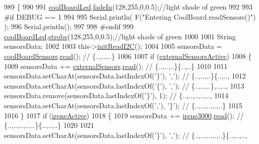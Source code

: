 \begin{DoxyCode}
989 \{
990 
991     \hyperlink{classCoolBoard_a1b1d3c684a5baa56b08486e192fd8e97}{coolBoardLed}.\hyperlink{classCoolBoardLed_ab778f5e7bed0ab74e3906d82110493c3}{fadeIn}(128,255,0,0.5);\textcolor{comment}{//light shade of green}
992                 
993 \textcolor{preprocessor}{#if DEBUG == 1}
994 
995     Serial.println( F(\textcolor{stringliteral}{"Entering CoolBoard.readSensors()"}) );
996     Serial.println();
997 
998 \textcolor{preprocessor}{#endif}
999     \hyperlink{classCoolBoard_a1b1d3c684a5baa56b08486e192fd8e97}{coolBoardLed}.\hyperlink{classCoolBoardLed_ad5f0de4c628cbfbf49896042831c64ad}{strobe}(128,255,0,0.5);\textcolor{comment}{//light shade of green}
1000 
1001     String sensorsData;
1002     
1003     this->\hyperlink{classCoolBoard_a397b46fadab8f530a8cf4d914c561366}{initReadI2C}();
1004 
1005     sensorsData = \hyperlink{classCoolBoard_af102be5288bd7f7a8e59b13f86e26a00}{coolBoardSensors}.\hyperlink{classCoolBoardSensors_a91badb2539d91fda8679f2a597874c48}{read}(); \textcolor{comment}{// \{..,..,..\}}
1006     
1007     \textcolor{keywordflow}{if} (\hyperlink{classCoolBoard_a638b00b76aeb819ecfd4c10b8cdd7bb7}{externalSensorsActive})
1008     \{
1009         sensorsData += \hyperlink{classCoolBoard_a09e26264839c65873eb56af476eff6b2}{externalSensors}.\hyperlink{classExternalSensors_a53177b81eca3be89508b5511ddcd00fc}{read}(); \textcolor{comment}{// \{..,..,..\}\{..,..\}}
1010 
1011         sensorsData.setCharAt(sensorsData.lastIndexOf(\textcolor{charliteral}{'\}'}), \textcolor{charliteral}{','}); \textcolor{comment}{// \{..,..,..\}\{..,..,}
1012         sensorsData.setCharAt(sensorsData.lastIndexOf(\textcolor{charliteral}{'\{'}), \textcolor{charliteral}{','}); \textcolor{comment}{// \{..,..,..\},..,..,}
1013         sensorsData.remove(sensorsData.lastIndexOf(\textcolor{charliteral}{'\}'}), 1); \textcolor{comment}{// \{..,..,..,..,..,}
1014         sensorsData.setCharAt(sensorsData.lastIndexOf(\textcolor{charliteral}{','}), \textcolor{charliteral}{'\}'}); \textcolor{comment}{// \{..,..,..,..,..\}}
1015 
1016     \}
1017     \textcolor{keywordflow}{if} (\hyperlink{classCoolBoard_a9c3f7ac625481ee2ae802a25d97a4ae0}{ireneActive})
1018     \{
1019         sensorsData += \hyperlink{classCoolBoard_ad103718ce316006c4695b8eb312eaf11}{irene3000}.\hyperlink{classIrene3000_a852a170feea994ea1df01c6b245b5d9a}{read}(); \textcolor{comment}{// \{..,..,..,..,..\}\{..,..,..\}}
1020 
1021         sensorsData.setCharAt(sensorsData.lastIndexOf(\textcolor{charliteral}{'\}'}), \textcolor{charliteral}{','}); \textcolor{comment}{// \{..,..,..,..,..\}\{..,..,..,}

\end{DoxyCode}
